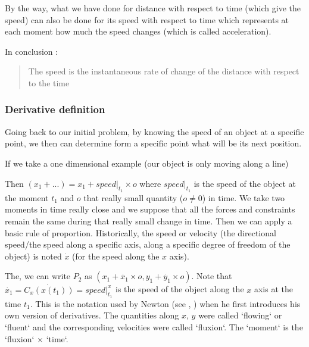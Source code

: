 \documentclass[12pt]{article}
\begin{document}
By the way, what we have done for distance with respect to time (which give the speed) can also be done for its speed with respect to time which represents at each moment how much the speed changes (which is called acceleration).

\bigskip 

In conclusion :

\begin{quote}
    The speed is the instantaneous rate of change of the distance with respect to the time
\end{quote}

\subsubsection{Derivative definition}


Going back to our initial problem, by knowing the speed of an object at a specific point, we then can determine form a specific point what will be its next position.

If we take a one dimensional example (our object is only moving along a line)

\begin{figure}[H]
 \centering
 
\end{figure}


Then $(x_1+...) = x_1 + speed|_{t_1} \times o$ where $speed|_{t_1}$ is the speed of the object at the moment $t_1$ and $o$ that really small quantity ($o \neq 0$) in time. We take two moments in time really close and we suppose that all the forces and constraints remain the same during that really small change in time. Then we can apply a basic rule of proportion. Historically, the speed or velocity \cite{wiki_velocity} (the directional speed/the speed along a specific axis, along a specific degree of freedom of the object) is noted $\dot{x}$ (for the speed along the $x$ axis).


The, we can write $P_2$ as $(x_1 + \dot{x_1} \times o, y_1 + \dot{y_1} \times o)$. Note that $\dot{x_1} = \dot{C_x(x(t_1))} = speed|^x_{t_1}$ is the speed of the object along the $x$ axis at the time $t_1$. This is the notation used by Newton (see \cite{pdf_newton_fluxions}, \cite{youtube_newton_infinitesimal_calculus}) when he first introduces his own version of derivatives. The quantities along $x$, $y$ were called `flowing` or `fluent` and the corresponding velocities were called `fluxion`. The `moment` is the `fluxion` $\times$ `time`.
\end{document}
